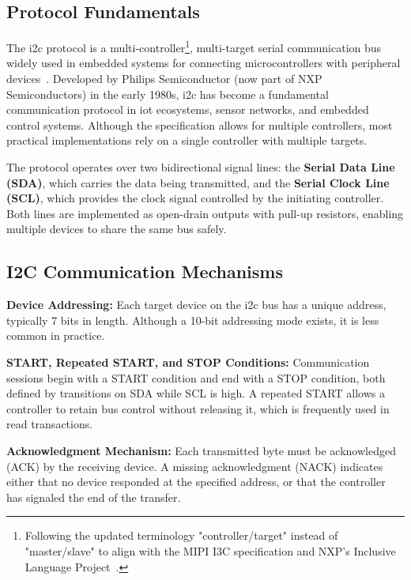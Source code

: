 \subsection{Protocol Fundamentals}
\label{subsec:i2c-fundamentals}

The \acrfull{i2c} protocol is a multi-controller\footnote{Following the updated terminology "controller/target" instead of "master/slave" to align with the MIPI I3C specification and NXP's Inclusive Language Project~\cite{i2c_specification}.}, multi-target serial communication bus widely used in embedded systems for connecting microcontrollers with peripheral devices~\cite{i2c_specification}. Developed by Philips Semiconductor (now part of NXP Semiconductors) in the early 1980s, \acrshort{i2c} has become a fundamental communication protocol in \acrshort{iot} ecosystems, sensor networks, and embedded control systems. Although the specification allows for multiple controllers, most practical implementations rely on a single controller with multiple targets.

The protocol operates over two bidirectional signal lines: the \textbf{Serial Data Line (SDA)}, which carries the data being transmitted, and the \textbf{Serial Clock Line (SCL)}, which provides the clock signal controlled by the initiating controller. Both lines are implemented as open-drain outputs with pull-up resistors, enabling multiple devices to share the same bus safely.

\subsection{I2C Communication Mechanisms}
\label{subsec:i2c-communication}

\textbf{Device Addressing:} Each target device on the \acrshort{i2c} bus has a unique address, typically 7 bits in length. Although a 10-bit addressing mode exists, it is less common in practice.

\textbf{START, Repeated START, and STOP Conditions:} Communication sessions begin with a START condition and end with a STOP condition, both defined by transitions on SDA while SCL is high. A repeated START allows a controller to retain bus control without releasing it, which is frequently used in read transactions.

\textbf{Acknowledgment Mechanism:} Each transmitted byte must be acknowledged (ACK) by the receiving device. A missing acknowledgment (NACK) indicates either that no device responded at the specified address, or that the controller has signaled the end of the transfer.





